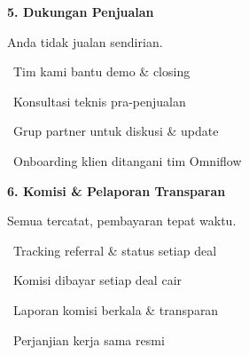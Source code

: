 \documentclass[a4paper]{article}
\begin{document}
\vspace{8pt}

\noindent
\begin{minipage}[t]{0.485\textwidth}
    \colorbox{OrangePrimary}{%
        \begin{minipage}{\dimexpr\textwidth-2\fboxsep\relax}
            {\fontsize{10}{13}\selectfont\bfseries\color{White} 5. Dukungan Penjualan}
        \end{minipage}}\par
    \vspace{4pt}
    {\fontsize{9}{12}\selectfont\color{TextDark}%
    Anda tidak jualan sendirian.\par\vspace{3pt}
    \textbullet\ Tim kami bantu demo \& closing\par\vspace{2pt}%
    \textbullet\ Konsultasi teknis pra-penjualan\par\vspace{2pt}%
    \textbullet\ Grup partner untuk diskusi \& update\par\vspace{2pt}%
    \textbullet\ Onboarding klien ditangani tim Omniflow}%
\end{minipage}%
\hfill
\begin{minipage}[t]{0.485\textwidth}
    \colorbox{EmeraldDark}{%
        \begin{minipage}{\dimexpr\textwidth-2\fboxsep\relax}
            {\fontsize{10}{13}\selectfont\bfseries\color{White} 6. Komisi \& Pelaporan Transparan}
        \end{minipage}}\par
    \vspace{4pt}
    {\fontsize{9}{12}\selectfont\color{TextDark}%
    Semua tercatat, pembayaran tepat waktu.\par\vspace{3pt}
    \textbullet\ Tracking referral \& status setiap deal\par\vspace{2pt}%
    \textbullet\ Komisi dibayar setiap deal cair\par\vspace{2pt}%
    \textbullet\ Laporan komisi berkala \& transparan\par\vspace{2pt}%
    \textbullet\ Perjanjian kerja sama resmi}%
\end{minipage}
\end{document}
